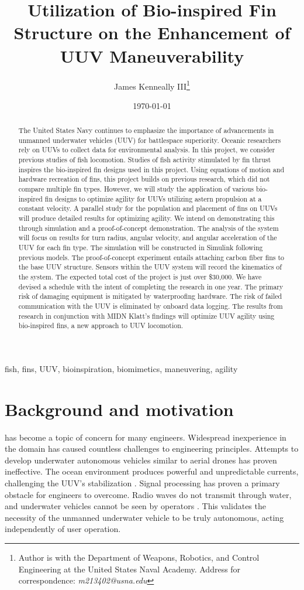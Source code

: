 \documentclass{IEEEtran}
\title{Utilization of Bio-inspired Fin Structure on the Enhancement of UUV Maneuverability}
\author{James Kenneally III\thanks{Author is with the Department of Weapons, Robotics, and Control Engineering at the United States Naval Academy. Address for correspondence: \emph{m213402@usna.edu}}}
\date{\today}
\begin{document}
\maketitle
\begin{abstract}
The United States Navy continues to emphasize the importance of advancements in unmanned underwater vehicles (UUV) for battlespace superiority.  Oceanic researchers rely on UUVs to collect data for environmental analysis.  In this project, we consider previous studies of fish locomotion.  Studies of fish activity stimulated by fin thrust inspires the bio-inspired fin designs used in this project.  Using equations of motion and hardware recreation of fins, this project builds on previous research, which did not compare multiple fin types.  However, we will study the application of various bio-inspired fin designs to optimize agility for UUVs utilizing astern propulsion at a constant velocity.  A parallel study for the population and placement of fins on UUVs will produce detailed results for optimizing agility.  We intend on demonstrating this through simulation and a proof-of-concept demonstration.  The analysis of the system will focus on results for turn radius, angular velocity, and angular acceleration of the UUV for each fin type.  The simulation will be constructed in Simulink following previous models.  The proof-of-concept experiment entails attaching carbon fiber fins to the base UUV structure.  Sensors within the UUV system will record the kinematics of the system.  The expected total cost of the project is just over \$30,000.  We have devised a schedule with the intent of completing the research in one year.  The primary risk of damaging equipment is mitigated by waterproofing hardware.  The risk of failed communication with the UUV is eliminated by onboard data logging.  The results from research in conjunction with MIDN Klatt’s findings will optimize UUV agility using bio-inspired fins, a new approach to UUV locomotion.  
\end{abstract}

\begin{IEEEkeywords}
fish, fins, UUV, bioinspiration, biomimetics, maneuvering, agility
\end{IEEEkeywords}

\section{Background and motivation}
 has become a topic of concern for many engineers.  Widespread inexperience in the domain has caused countless challenges to engineering principles.  Attempts to develop underwater autonomous vehicles similar to aerial drones has proven ineffective.  The ocean environment produces powerful and unpredictable currents, challenging the UUV’s stabilization \cite{risen2019underwater}.  Signal processing has proven a primary obstacle for engineers to overcome.  Radio waves do not transmit through water, and underwater vehicles cannot be seen by operators \cite{risen2019underwater}.  This validates the necessity of the unmanned underwater vehicle to be truly autonomous, acting independently of user operation.  
\end{document}
